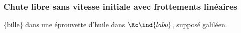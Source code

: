 \documentclass[../../main/main.tex]{subfiles}
\begin{document}
\subsubsection{Chute libre sans vitesse initiale avec frottements linéaires}
\hspace*{-0.75cm}
\begin{minipage}[t]{0.65\linewidth}
	\begin{enumerate}[label=\sqenumi]
		 \{bille\} dans une
		éprouvette d'huile dans $\Rc\ind{labo}$, supposé galiléen.
	\end{enumerate}
\end{minipage}
\hfill
\begin{minipage}[t]{0.30\linewidth}
	\begin{center}
		\vspace{-12pt}
	\end{center}
\end{minipage}
\vspace{-55pt}
\end{document}
